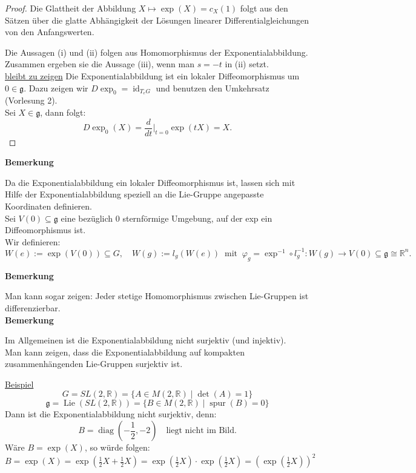 \documentclass[fleqn, 12pt, letterpaper]{article}
\begin{document}
\begin{proof}
    Die Glattheit der Abbildung \( X \mapsto \exp(X)=c_X(1) \) folgt aus den Sätzen über die glatte Abhängigkeit der Lösungen linearer Differentialgleichungen von den Anfangswerten.

Die Aussagen (i) und (ii) folgen aus Homomorphismus der Exponentialabbildung. Zusammen ergeben sie die Aussage (iii), wenn man \( s = -t \) in (ii) setzt.\\

\underline{bleibt zu zeigen}
Die Exponentialabbildung ist ein lokaler Diffeomorphismus um \( 0 \in \mathfrak{g} \). Dazu zeigen wir \( D\exp_0 = \operatorname{id}_{T_e G} \) und benutzen den Umkehrsatz (Vorlesung 2).\\
Sei \( X \in \mathfrak{g} \), dann folgt:
\[
D\exp_0(X) = \frac{d}{dt} \big|_{t=0} \exp(tX) = X.
\]
\end{proof}

\textbf{Bemerkung}

Da die Exponentialabbildung ein lokaler Diffeomorphismus ist, lassen sich mit Hilfe der Exponentialabbildung speziell an die Lie-Gruppe angepasste Koordinaten definieren.\\
Sei \( V(0) \subseteq \mathfrak{g} \) eine bezüglich 0 sternförmige Umgebung, auf der exp ein Diffeomorphismus ist.\\
Wir definieren:
\[
W(e) := \exp (V(0))\subseteq G, \quad W(g) := l_g(W(e)) \;\; \text{mit} \;\; \varphi_g=\exp^{-1}\circ l_g^{-1}: W(g) \rightarrow V(0) \subseteq \mathfrak{g} \cong \mathbb{R}^n.
\]

\textbf{Bemerkung}

Man kann sogar zeigen: Jeder stetige Homomorphismus zwischen Lie-Gruppen ist differenzierbar.\\

\textbf{Bemerkung}

Im Allgemeinen ist die Exponentialabbildung nicht surjektiv (und injektiv).\\
Man kann zeigen, dass die Exponentialabbildung auf kompakten zusammenhängenden Lie-Gruppen surjektiv ist.

\underline{Beispiel}
\[
G = SL(2, \mathbb{R}) = \{A \in M(2, \mathbb{R}) \mid \det(A) = 1 \}
\]
\[
\mathfrak{g} = \operatorname{Lie}(SL(2, \mathbb{R})) = \{B \in M(2, \mathbb{R}) \mid \operatorname{spur}(B) = 0 \}
\]
Dann ist die Exponentialabbildung nicht surjektiv, denn:
\[
B = \operatorname{diag}\left(-\frac{1}{2}, -2\right) \quad \text{liegt nicht im Bild}.
\]
Wäre \( B = \exp(X) \), so würde folgen:
\[
B = \exp(X) 
= \exp\left( \tfrac{1}{2}X + \tfrac{1}{2}X \right) 
= \exp\left( \tfrac{1}{2}X \right) \cdot \exp\left( \tfrac{1}{2}X \right) 
= \left( \exp\left( \tfrac{1}{2}X \right) \right)^2
\]
\end{document}
